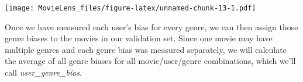 \documentclass[
]{article}
\newenvironment{Shaded}{\begin{snugshade}}{\end{snugshade}}
\newcommand{\DataTypeTok}[1]{\textcolor[rgb]{0.13,0.29,0.53}{#1}}
\newcommand{\KeywordTok}[1]{\textcolor[rgb]{0.13,0.29,0.53}{\textbf{#1}}}
\newcommand{\NormalTok}[1]{#1}
\newcommand{\OperatorTok}[1]{\textcolor[rgb]{0.81,0.36,0.00}{\textbf{#1}}}
\newcommand{\StringTok}[1]{\textcolor[rgb]{0.31,0.60,0.02}{#1}}
\begin{document}
\texttt{[image: MovieLens\_files/figure-latex/unnamed-chunk-13-1.pdf]}

Once we have measured each user's bias for every genre, we can then
assign those genre biases to the movies in our validation set. Since one
movie may have multiple genres and each genre bias was measured
separately, we will calculate the average of all genre biases for all
movie/user/genre combinations, which we'll call
\emph{user\_genre\_bias}.

\begin{Shaded}
\end{Shaded}
\end{document}
